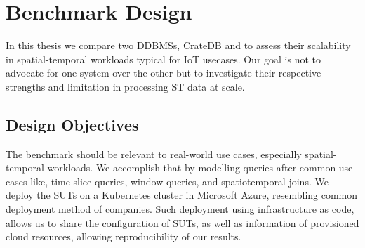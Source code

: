 \section{Benchmark Design}
\label{cha:benchmarkdesign}

%
%
%

In this thesis we compare two DDBMSs, CrateDB and \mobilitydbc to assess their scalability in spatial-temporal workloads typical for IoT usecases.
Our goal is not to advocate for one system over the other but to investigate their respective strengths and limitation in processing ST data at scale.

\subsection{Design Objectives}
The benchmark should be relevant to real-world use cases, especially spatial-temporal workloads.
We accomplish that by modelling queries after common use cases like, time slice queries, window queries, and spatiotemporal joins.
We deploy the SUTs on a Kubernetes cluster in Microsoft Azure, resembling common deployment method of companies.
Such deployment using infrastructure as code, allows us to share the configuration of SUTs, as well as information of provisioned cloud resources, allowing reproducibility of our results.

